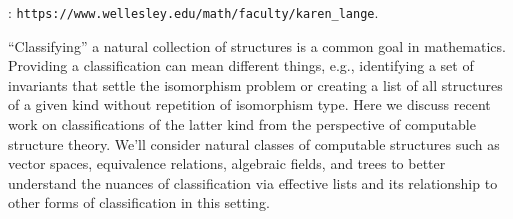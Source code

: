 \documentclass[bsl,meeting]{asl}
\def\urladdr#1{\endgraf\noindent{\it URL Address}: {\tt #1}.}
\newcommand{\NP}{}
\begin{document}
\thispagestyle{empty}


\NP%
%
%
%
%
\urladdr{https://www.wellesley.edu/math/faculty/karen\_lange}

``Classifying” a natural collection of structures is  a common goal in mathematics.  Providing a classification can mean different things, e.g., identifying a set of invariants that settle the isomorphism problem or  creating a list of all structures of a given kind without repetition of isomorphism type. Here we discuss recent work on classifications of the latter kind from the perspective of computable structure theory.   We’ll consider natural classes of computable structures such as vector spaces, equivalence relations, algebraic fields, and trees to better understand the nuances of classification via effective lists and its relationship to other forms of classification in this setting.
\end{document}
